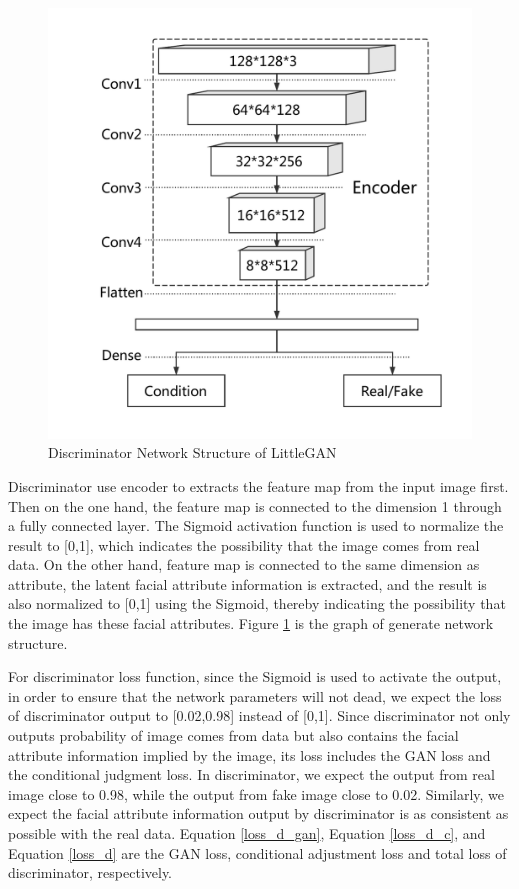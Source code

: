 \begin{figure}
\begin{minipage}[t]{0.48\linewidth}
        \includegraphics[width=\textwidth]{figures/net_discriminator.pdf}
        \caption{Discriminator Network Structure of LittleGAN}
        \label{net_discriminator}
    \end{minipage}
\end{figure}

Discriminator use encoder to extracts the feature map from the input image first.
Then on the one hand, the feature map is connected to the dimension 1 through a fully connected layer.
The Sigmoid activation function is used to normalize the result to [0,1],
    which indicates the possibility that the image comes from real data.
On the other hand, feature map is connected to the same dimension as attribute,
    the latent facial attribute information is extracted,
    and the result is also normalized to [0,1] using the Sigmoid,
    thereby indicating the possibility that the image has these facial attributes.
Figure \ref{net_discriminator} is the graph of generate network structure.

For discriminator loss function, since the Sigmoid is used to activate the output,
    in order to ensure that the network parameters will not dead,
    we expect the loss of discriminator output to [0.02,0.98] instead of [0,1].
Since discriminator not only outputs probability of image comes from data but also contains the facial attribute information implied by the image,
    its loss includes the GAN loss and the conditional judgment loss.
In discriminator, we expect the output from real image close to 0.98, while the output from fake image close to 0.02.
Similarly, we expect the facial attribute information output by discriminator is as consistent as possible with the real data.
Equation \eqref{loss_d_gan}, Equation \eqref{loss_d_c}, and Equation \eqref{loss_d} are the GAN loss,
    conditional adjustment loss and total loss of discriminator, respectively.

